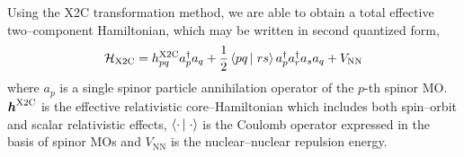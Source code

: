 Using the X2C transformation method, we are able to obtain a total effective
two--component Hamiltonian, which may be written in second quantized form,
\begin{equation}
\mathcal{H}_\mathrm{X2C} = h_{pq}^\mathrm{X2C}a_p^\dagger a_q + 
  \frac{1}{2} \left\langle pq \left\vert\right. rs \right\rangle a_p^\dagger a_r^\dagger a_s a_q + V_\mathrm{NN}
  \label{eq:X2CHam}
\end{equation}
where $a_p$ is a single spinor particle annihilation operator of the $p$-th
spinor MO. $\boldsymbol{h}^\mathrm{X2C}$ is the effective relativistic core--Hamiltonian
which includes both spin--orbit and scalar relativistic effects,
\cite{Gropen96_365,Peng06_044102,Cheng07_104106,Cremer13_014106,Liu16_204,
Boettger00_7809,Neese04_book541}
$\left\langle \cdot \left\vert\right. \cdot \right\rangle$ is the Coulomb operator expressed in the basis of spinor
MOs and $V_\mathrm{NN}$ is the nuclear--nuclear repulsion energy. 
